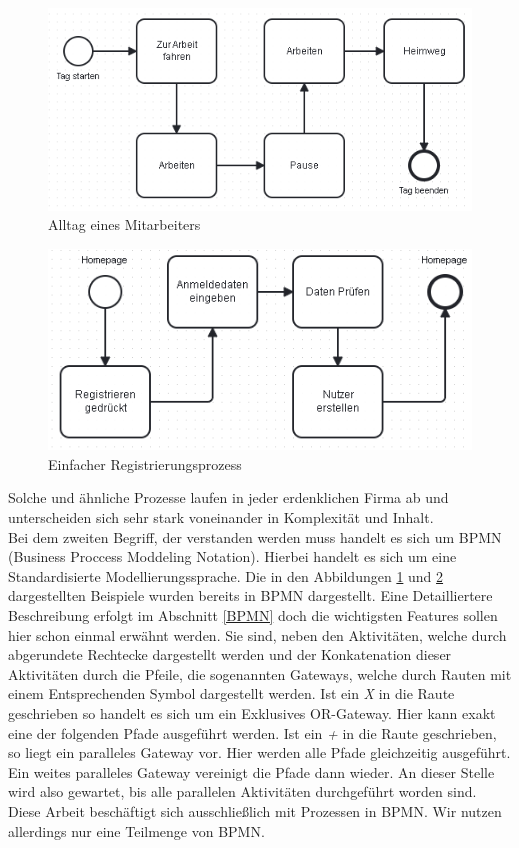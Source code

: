 \begin{figure}
\centering
\includegraphics[scale=0.7]{Figures/Einleitungbsp1}
\decoRule
\caption[Alltag eines Mitarbeiters]{Alltag eines Mitarbeiters}
\label{Alltag}
\end{figure}\begin{figure}
\centering
\includegraphics[scale=0.7]{Figures/Einleitungbsp2}
\decoRule
\caption[Einfacher Registrierungsprozess]{Einfacher Registrierungsprozess}
\label{ersteReg}
\end{figure}Solche und ähnliche Prozesse laufen in jeder erdenklichen Firma ab und unterscheiden sich sehr stark voneinander in Komplexität und Inhalt.\\
Bei dem zweiten Begriff, der verstanden werden muss handelt es sich um BPMN (Business Proccess Moddeling Notation). Hierbei handelt es sich um eine Standardisierte Modellierungssprache. Die in den Abbildungen \ref{Alltag} und  \ref{ersteReg} dargestellten Beispiele wurden bereits in BPMN dargestellt. Eine Detailliertere Beschreibung erfolgt im Abschnitt \ref{BPMN} doch die wichtigsten Features sollen hier schon einmal erwähnt werden. Sie sind, neben den Aktivitäten, welche durch abgerundete Rechtecke dargestellt werden und der Konkatenation dieser Aktivitäten durch die Pfeile, die sogenannten Gateways, welche durch Rauten mit einem Entsprechenden Symbol dargestellt werden. Ist ein \textit{X} in die Raute geschrieben so handelt es sich um ein Exklusives OR-Gateway. Hier kann exakt eine der folgenden Pfade ausgeführt werden. Ist ein \textit{+} in die Raute geschrieben, so liegt ein paralleles Gateway vor. Hier werden alle Pfade gleichzeitig ausgeführt. Ein weites paralleles Gateway vereinigt die Pfade dann wieder. An dieser Stelle wird also gewartet, bis alle parallelen Aktivitäten durchgeführt worden sind. Diese Arbeit beschäftigt sich ausschließlich mit Prozessen in BPMN. Wir nutzen allerdings nur eine Teilmenge von BPMN.\\
